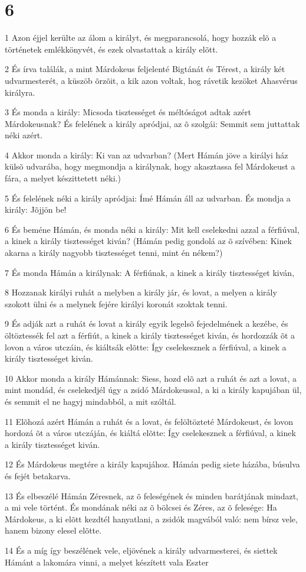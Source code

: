 \chapter{6}

\par 1 Azon éjjel kerülte az álom a királyt, és megparancsolá, hogy hozzák elõ a történetek emlékkönyvét, és ezek olvastattak a király elõtt.
\par 2 És írva találák, a mint Márdokeus feljelenté Bigtánát és Térest, a király két udvarmesterét, a küszöb õrzõit, a kik azon voltak, hog rávetik kezöket Ahasvérus királyra.
\par 3 És monda a király: Micsoda tisztességet és méltóságot adtak azért Márdokeusnak? És felelének a király apródjai, az õ szolgái: Semmit sem juttattak néki azért.
\par 4 Akkor monda a király: Ki van az udvarban? (Mert Hámán jöve a királyi ház külsõ udvarába, hogy megmondja a királynak, hogy akasztassa fel Márdokeust a fára, a melyet készittetett néki.)
\par 5 És felelének néki a király apródjai: Ímé Hámán áll az udvarban. És mondja a király: Jõjjön be!
\par 6 És beméne Hámán, és monda néki a király: Mit kell cselekedni azzal a férfiúval, a kinek a király tisztességet kiván? (Hámán pedig gondolá az õ szívében: Kinek akarna a király nagyobb tisztességet tenni, mint én nékem?)
\par 7 És monda Hámán a királynak: A férfiúnak, a kinek a király tisztességet kiván,
\par 8 Hozzanak királyi ruhát a melyben a király jár, és lovat, a melyen a király szokott ülni  és a melynek fejére királyi koronát szoktak tenni.
\par 9 És adják azt a ruhát és lovat a király egyik legelsõ fejedelmének a kezébe, és öltöztessék fel azt a férfiút, a kinek a király tisztességet kiván, és hordozzák õt a lovon a város utczáin, és kiáltsák elõtte: Így cselekesznek a férfiúval, a kinek a király tisztességet kiván.
\par 10 Akkor monda a király Hámánnak: Siess, hozd elõ azt a ruhát és azt a lovat, a mint mondád, és cselekedjél úgy a zsidó Márdokeussal, a ki a király kapujában ül, és semmit el ne hagyj mindabból, a mit szóltál.
\par 11 Elõhozá azért Hámán a ruhát és a lovat, és felöltözteté Márdokeust, és lovon hordozá õt a város utczáján, és kiáltá elõtte: Így cselekesznek a férfiúval, a kinek a király tisztességet kiván.
\par 12 És Márdokeus megtére a király kapujához. Hámán pedig siete házába, búsulva és fejét betakarva.
\par 13 És elbeszélé Hámán Zéresnek, az õ feleségének és minden barátjának mindazt, a mi vele történt. És mondának néki az õ bölcsei és Zéres, az õ felesége: Ha Márdokeus, a ki elõtt kezdtél hanyatlani, a zsidók magvából való: nem bírsz vele, hanem bizony elesel elõtte.
\par 14 És a míg így beszélének vele, eljövének a király udvarmesterei, és siettek Hámánt a lakomára vinni, a melyet készített vala Eszter

